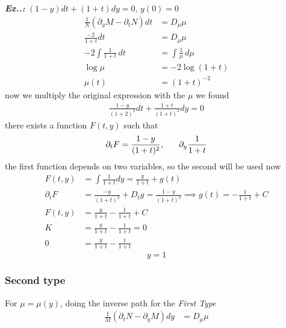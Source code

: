 \documentclass[a4paper]{article}
\begin{document}
\vspace{2ex}\textit{\textbf{Ex.\thesection.\theprob:}} $(1-y)dt+(1+t)dy=0,\,y(0)=0$
\begin{align}
    \frac{1}{N}\left(\partial_yM-\partial_tN\right)dt&=D_\mu\mu \\
    \frac{-2}{1+t}dt&=D_\mu\mu \\
    -2\int\frac{1}{1+t}\,dt&=\int\frac{1}{\mu}\,d\mu \\
    \log \mu&=-2\log (1+t) \\
    \mu(t)&=(1+t)^{-2}
\end{align}
now we multiply the original expression with the $\mu$ we found
\begin{align}
    \frac{1-y}{(1+2)^2}dt+\frac{1+t}{(1+t)^2}dy=0
\end{align}
there exists a function $F(t,y)$ such that
\begin{align}
    \partial_tF=\frac{1-y}{(1+t)^2},\hspace{4ex}\partial_y\frac{1}{1+t}
\end{align}
the first function depends on two variables, so the second will be used now
\begin{align}
    F(t,y)&=\int \frac{1}{1+t}dy=\frac{y}{1+t}+g(t)\\ 
    \partial_tF&=\frac{-y}{(1+t)^2}+D_tg=\frac{1-y}{(1+t)^2}\implies g(t)=-\frac{1}{1+t}+C \\
    F(t,y)&=\frac{y}{1+t}-\frac{1}{1+t}+C \\
    K&=\frac{y}{1+t}-\frac{1}{1+t}=0 \\
    0&=\frac{y}{1+t}-\frac{1}{1+t}
\end{align}
$$
\boxed{y=1}
$$

\subsubsection{Second type}

For $\mu=\mu(y)$, doing the inverse path for the \textit{First Type}
\begin{align}
    \frac{1}{M}\left(\partial_tN-\partial_yM\right)dy&=D_\mu\mu
\end{align}
\end{document}
